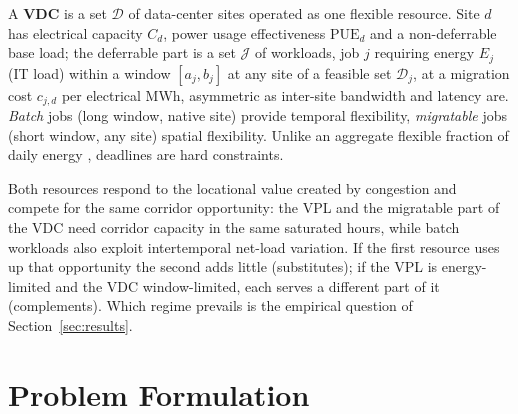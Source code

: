 \documentclass[conference]{IEEEtran}
\begin{document}
A \textbf{VDC} is a set $\mathcal{D}$ of data-center sites operated as one flexible resource. Site $d$ has electrical capacity $C_d$, power usage effectiveness $\mathrm{PUE}_d$ and a non-deferrable base load; the deferrable part is a set $\mathcal{J}$ of workloads, job $j$ requiring energy $E_j$ (IT load) within a window $[a_j,b_j]$ at any site of a feasible set $\mathcal{D}_j$, at a migration cost $c_{j,d}$ per electrical MWh, asymmetric as inter-site bandwidth and latency are. \emph{Batch} jobs (long window, native site) provide temporal flexibility, \emph{migratable} jobs (short window, any site) spatial flexibility. Unlike an aggregate flexible fraction of daily energy \cite{wan2026scuc}, deadlines are hard constraints.

Both resources respond to the locational value created by congestion and compete for the same corridor opportunity: the VPL and the migratable part of the VDC need corridor capacity in the same saturated hours, while batch workloads also exploit intertemporal net-load variation. If the first resource uses up that opportunity the second adds little (substitutes); if the VPL is energy-limited and the VDC window-limited, each serves a different part of it (complements). Which regime prevails is the empirical question of Section~\ref{sec:results}.

\section{Problem Formulation}
\label{sec:model}
\end{document}
